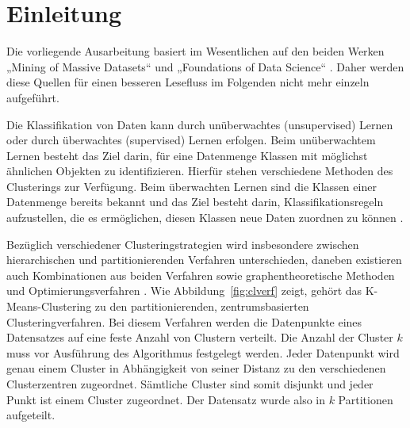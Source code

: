 \documentclass[a4paper,12pt,twoside]{article}
\begin{document}

\section{Einleitung}
\par
Die vorliegende Ausarbeitung basiert im Wesentlichen auf den beiden Werken „Mining of Massive Datasets“ \citep{Lesk2014} und „Foundations of Data Science“ \citep{blum2016f}. Daher werden diese Quellen für einen besseren Lesefluss im Folgenden nicht mehr einzeln aufgeführt.
\\
\par
Die Klassifikation von Daten kann durch unüberwachtes (unsupervised) Lernen oder  durch überwachtes (supervised) Lernen erfolgen. Beim unüberwachtem Lernen besteht das Ziel darin, für eine Datenmenge Klassen mit möglichst ähnlichen Objekten zu identifizieren. Hierfür stehen verschiedene Methoden des Clusterings zur Verfügung. Beim überwachten Lernen sind die Klassen einer Datenmenge bereits bekannt und das Ziel besteht darin, Klassifikationsregeln aufzustellen, die es ermöglichen, diesen Klassen neue Daten zuordnen zu können \citep{Vos2004}.
\\
\par
Bezüglich verschiedener Clusteringstrategien wird insbesondere zwischen hierarchischen und partitionierenden Verfahren unterschieden, daneben existieren auch Kombinationen aus beiden Verfahren sowie graphentheoretische Methoden und Optimierungsverfahren \citep{Backh2008}. Wie Abbildung~\ref{fig:clverf} zeigt, gehört das K-Means-Clustering zu den partitionierenden, zentrumsbasierten Clusteringverfahren. Bei diesem Verfahren werden die Datenpunkte eines Datensatzes auf eine feste Anzahl von Clustern verteilt. Die Anzahl der Cluster $k$ muss vor Ausführung des Algorithmus festgelegt werden. Jeder Datenpunkt wird genau einem Cluster in Abhängigkeit von seiner Distanz zu den verschiedenen Clusterzentren zugeordnet. Sämtliche Cluster sind somit disjunkt und jeder Punkt ist einem Cluster zugeordnet. Der Datensatz wurde also in $k$ Partitionen aufgeteilt.
\\
\\
\end{document}
